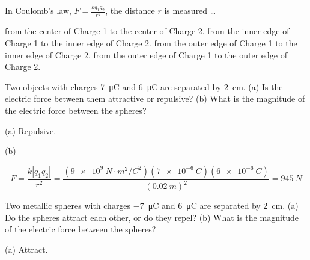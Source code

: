 \documentclass[]{exam}
\begin{document}
\begin{questions}



\question
In Coulomb's law, $\displaystyle F = \frac{kq_1q_2}{r^2}$, the distance $r$ is measured
\ldots

\begin{randomizechoices}
    \correctchoice from the center of Charge 1 to the center of Charge 2.
    \choice from the inner edge of Charge 1 to the inner edge of Charge 2.
    \choice from the outer edge of Charge 1 to the inner edge of Charge 2.
    \choice from the outer edge of Charge 1 to the outer edge of Charge 2.
\end{randomizechoices}



\question \label{z4pMlx}
Two objects with charges \SI{7}{\micro C} and \SI{6}{\micro C} are separated by \SI{2}{cm}. (a) Is the electric force between them attractive or repulsive? (b) What is the magnitude of the electric force between the spheres?

\begin{solution}
(a) Repulsive. 

(b) 

\begin{equation*}
    F = \frac{k \left|q_1 q_2\right|}{r^2} = \frac{\left(\SI{9e9}{N\cdot m^2/C^2}\right)(\SI{7e-6}{C})(\SI{6e-6}{C})}{\left(\SI{0.02}{m}\right)^2} = \boxed{\SI{945}{N}}
\end{equation*}

\end{solution}


\question \label{TPIAio}
Two metallic spheres with charges \SI{-7}{\micro C} and \SI{6}{\micro C} are separated by \SI{2}{cm}. (a) Do the spheres attract each other, or do they repel? (b) What is the magnitude of the electric force between the spheres?

\begin{solution}
(a) Attract. 


\end{solution}
\end{questions}
\end{document}

